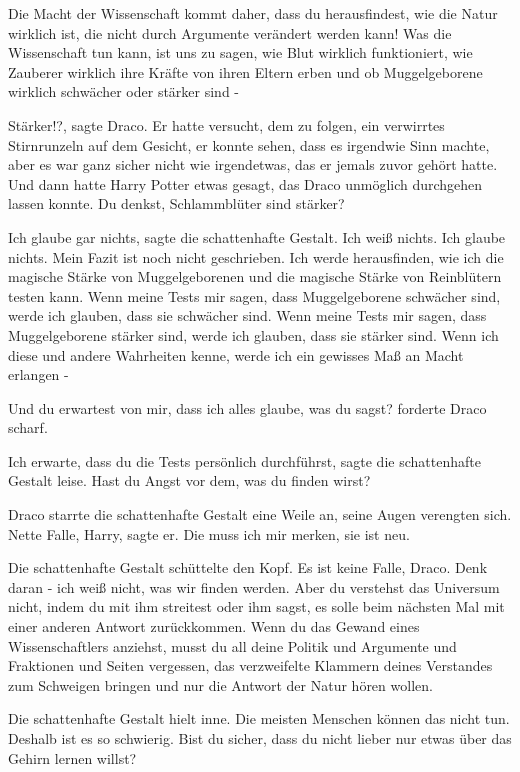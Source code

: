 Die Macht der Wissenschaft kommt daher, dass du herausfindest, wie die Natur
wirklich ist, die nicht durch Argumente verändert werden kann! Was die
Wissenschaft tun kann, ist uns zu sagen, wie Blut wirklich funktioniert, wie
Zauberer wirklich ihre Kräfte von ihren Eltern erben und ob Muggelgeborene
wirklich schwächer oder stärker sind -\grqq{}

\glqq{}Stärker!?\grqq{}, sagte Draco. Er hatte versucht, dem zu folgen, ein
verwirrtes Stirnrunzeln auf dem Gesicht, er konnte sehen, dass es irgendwie Sinn
machte, aber es war ganz sicher nicht wie irgendetwas, das er jemals zuvor
gehört hatte. Und dann hatte Harry Potter etwas gesagt, das Draco unmöglich
durchgehen lassen konnte. \glqq{}Du denkst, Schlammblüter sind stärker?\grqq{}

\glqq{}Ich glaube gar nichts\grqq{}, sagte die schattenhafte Gestalt. \glqq{}Ich
weiß nichts. Ich glaube nichts. Mein Fazit ist noch nicht geschrieben. Ich werde
herausfinden, wie ich die magische Stärke von Muggelgeborenen und die magische
Stärke von Reinblütern testen kann. Wenn meine Tests mir sagen, dass
Muggelgeborene schwächer sind, werde ich glauben, dass sie schwächer sind. Wenn
meine Tests mir sagen, dass Muggelgeborene stärker sind, werde ich glauben, dass
sie stärker sind. Wenn ich diese und andere Wahrheiten kenne, werde ich ein
gewisses Maß an Macht erlangen -\grqq{}

\glqq{}Und du erwartest von mir, dass ich alles glaube, was du sagst?\grqq{}
forderte Draco scharf.

\glqq{}Ich erwarte, dass du die Tests persönlich durchführst\grqq{}, sagte die
schattenhafte Gestalt leise. \glqq{}Hast du Angst vor dem, was du finden
wirst?\grqq{}

Draco starrte die schattenhafte Gestalt eine Weile an, seine Augen verengten
sich. \glqq{}Nette Falle, Harry\grqq{}, sagte er. \glqq{}Die muss ich mir merken,
sie ist neu.\grqq{}

Die schattenhafte Gestalt schüttelte den Kopf. \glqq{}Es ist keine Falle, Draco.
Denk daran - ich weiß nicht, was wir finden werden. Aber du verstehst das
Universum nicht, indem du mit ihm streitest oder ihm sagst, es solle beim
nächsten Mal mit einer anderen Antwort zurückkommen. Wenn du das Gewand eines
Wissenschaftlers anziehst, musst du all deine Politik und Argumente und
Fraktionen und Seiten vergessen, das verzweifelte Klammern deines Verstandes zum
Schweigen bringen und nur die Antwort der Natur hören wollen.\grqq{}

Die schattenhafte Gestalt hielt inne. \glqq{}Die meisten Menschen können das
nicht tun. Deshalb ist es so schwierig. Bist du sicher, dass du nicht lieber nur
etwas über das Gehirn lernen willst?\grqq{}

